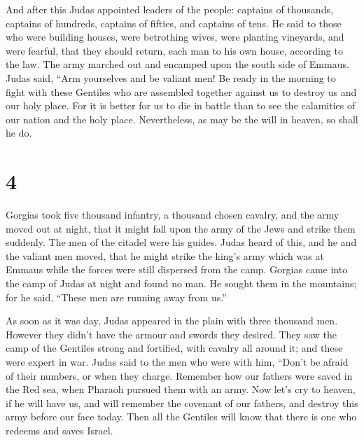 And after this Judas appointed leaders of the people:
captains of thousands, captains of hundreds, captains of fifties, and
captains of tens.  He said to those who were building
houses, were betrothing wives, were planting vineyards, and were
fearful, that they should return, each man to his own house, according
to the law.  The army marched out and encamped upon the
south side of Emmaus.  Judas said, ``Arm yourselves and be
valiant men! Be ready in the morning to fight with these Gentiles who
are assembled together against us to destroy us and our holy place.
 For it is better for us to die in battle than to see the
calamities of our nation and the holy place.  Nevertheless,
as may be the will in heaven, so shall he do.

\hypertarget{section-3}{%
\section{4}\label{section-3}}

 Gorgias took five thousand infantry, a thousand chosen
cavalry, and the army moved out at night,  that it might
fall upon the army of the Jews and strike them suddenly. The men of the
citadel were his guides.  Judas heard of this, and he and
the valiant men moved, that he might strike the king's army which was at
Emmaus  while the forces were still dispersed from the camp.
 Gorgias came into the camp of Judas at night and found no
man. He sought them in the mountains; for he said, ``These men are
running away from us.''

 As soon as it was day, Judas appeared in the plain with
three thousand men. However they didn't have the armour and swords they
desired.  They saw the camp of the Gentiles strong and
fortified, with cavalry all around it; and these were expert in war.
 Judas said to the men who were with him, ``Don't be afraid
of their numbers, or when they charge.  Remember how our
fathers were saved in the Red sea, when Pharaoh pursued them with an
army.  Now let's cry to heaven, if he will have us, and
will remember the covenant of our fathers, and destroy this army before
our face today.  Then all the Gentiles will know that there
is one who redeems and saves Israel.

